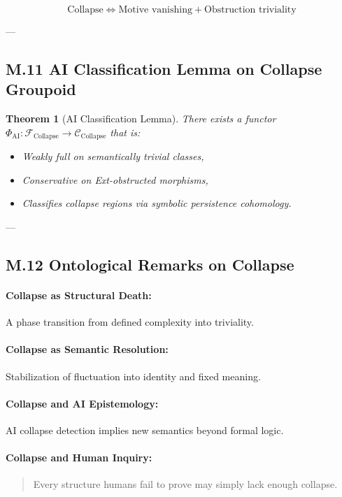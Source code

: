 \documentclass[11pt]{article}
\newtheorem{theorem}{Theorem}[section]
\begin{document}
\begin{axiom}
\begin{axiom}
{{\[
\text{Collapse} \Longleftrightarrow \text{Motive vanishing} + \text{Obstruction triviality}
\]

---

\subsection*{M.11 AI Classification Lemma on Collapse Groupoid}

\begin{theorem}[AI Classification Lemma]
There exists a functor $\Phi_{\text{AI}}: \mathcal{F}_{\text{Collapse}} \to \mathcal{C}_{\text{Collapse}}$  
that is:

\begin{itemize}
  \item Weakly full on semantically trivial classes,
  \item Conservative on Ext-obstructed morphisms,
  \item Classifies collapse regions via symbolic persistence cohomology.
\end{itemize}
\end{theorem}

---

\subsection*{M.12 Ontological Remarks on Collapse}

\paragraph{Collapse as Structural Death:}  
A phase transition from defined complexity into triviality.

\paragraph{Collapse as Semantic Resolution:}  
Stabilization of fluctuation into identity and fixed meaning.

\paragraph{Collapse and AI Epistemology:}  
AI collapse detection implies new semantics beyond formal logic.

\paragraph{Collapse and Human Inquiry:}  
\begin{quote}
Every structure humans fail to prove may simply lack enough collapse.
\end{quote}

}}
\end{axiom}
\end{axiom}
\end{document}
